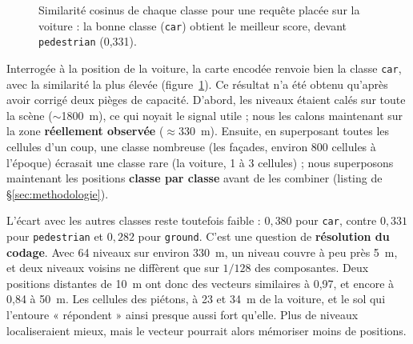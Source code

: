 \documentclass[12pt,a4paper,titlepage]{article}
\begin{document}
\begin{figure}[H]
    \centering
    \caption{Similarité cosinus de chaque classe pour une requête placée sur la voiture : la bonne classe (\texttt{car}) obtient le meilleur score, devant \texttt{pedestrian} (0,331).}
    \label{fig:chart_hd_query}
\end{figure}

Interrogée à la position de la voiture, la carte encodée renvoie bien la classe \texttt{car}, avec la similarité la plus élevée (figure~\ref{fig:chart_hd_query}). Ce résultat n'a été obtenu qu'après avoir corrigé deux pièges de capacité. D'abord, les niveaux étaient calés sur toute la scène ($\sim$1800~m), ce qui noyait le signal utile ; nous les calons maintenant sur la zone \textbf{réellement observée} ($\approx$330~m). Ensuite, en superposant toutes les cellules d'un coup, une classe nombreuse (les façades, environ 800 cellules à l'époque) écrasait une classe rare (la voiture, 1 à 3 cellules) ; nous superposons maintenant les positions \textbf{classe par classe} avant de les combiner (listing de \S\ref{sec:methodologie}).

L'écart avec les autres classes reste toutefois faible : $0{,}380$ pour \texttt{car}, contre $0{,}331$ pour \texttt{pedestrian} et $0{,}282$ pour \texttt{ground}. C'est une question de \textbf{résolution du codage}. Avec 64 niveaux sur environ 330~m, un niveau couvre à peu près 5~m, et deux niveaux voisins ne diffèrent que sur $1/128$ des composantes. Deux positions distantes de 10~m ont donc des vecteurs similaires à 0,97, et encore à 0,84 à 50~m. Les cellules des piétons, à 23 et 34~m de la voiture, et le sol qui l'entoure « répondent » ainsi presque aussi fort qu'elle. Plus de niveaux localiseraient mieux, mais le vecteur pourrait alors mémoriser moins de positions.
\end{document}
